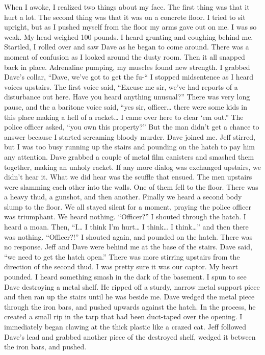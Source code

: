 \documentclass[a4paper]{article}
\begin{document}
When I awoke, I realized two things about my face. The first thing was that it hurt a lot. The second thing was that it was on a concrete floor.
I tried to sit upright, but as I pushed myself from the floor my arms gave out on me. I was so weak. My head weighed 100 pounds.
I heard grunting and coughing behind me. Startled, I rolled over and saw Dave as he began to come around. There was a moment of confusion as I looked around the dusty room. Then it all snapped back in place.
Adrenaline pumping, my muscles found new strength. I grabbed Dave’s collar, “Dave, we’ve got to get the fu-“
I stopped midsentence as I heard voices upstairs.
The first voice said, “Excuse me sir, we’ve had reports of a disturbance out here. Have you heard anything unusual?”
There was very long pause, and the a baritone voice said, “yes sir, officer… there were some kids in this place making a hell of a racket… I came over here to clear ‘em out.”
The police officer asked, “you own this property?”
But the man didn’t get a chance to answer because I started screaming bloody murder. Dave joined me. Jeff stirred, but I was too busy running up the stairs and pounding on the hatch to pay him any attention.
Dave grabbed a couple of metal film canisters and smashed them together, making an unholy racket.
If any more dialog was exchanged upstairs, we didn’t hear it. What we did hear was the scuffle that ensued. The men upstairs were slamming each other into the walls. One of them fell to the floor. There was a heavy thud, a gunshot, and then another. Finally we heard a second body slump to the floor.
We all stayed silent for a moment, praying the police officer was triumphant. We heard nothing.
“Officer?” I shouted through the hatch.
I heard a moan. Then, “I… I think I’m hurt… I think… I think…” and then there was nothing.
“Officer?!” I shouted again, and pounded on the hatch. There was no response.
Jeff and Dave were behind me at the base of the stairs. Dave said, “we need to get the hatch open.”
There was more stirring upstairs from the direction of the second thud. I was pretty sure it was our captor. My heart pounded.
I heard something smash in the dark of the basement. I spun to see Dave destroying a metal shelf. He ripped off a sturdy, narrow metal support piece and then ran up the stairs until he was beside me.
Dave wedged the metal piece through the iron bars, and pushed upwards against the hatch. In the process, he created a small rip in the tarp that had been duct-taped over the opening. I immediately began clawing at the thick plastic like a crazed cat.
Jeff followed Dave’s lead and grabbed another piece of the destroyed shelf, wedged it between the iron bars, and pushed.
\end{document}

